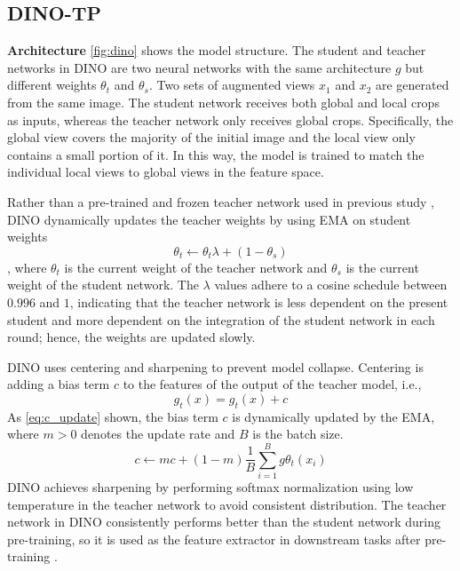 \documentclass[10pt,twocolumn,letterpaper]{article}
\begin{document}
\subsection{DINO-TP}
\label{section:dino-tp}
\textbf{Architecture }
\cref{fig:dino} shows the model structure.
The student and teacher networks in DINO are two neural networks with the same architecture $g$ but different weights $\theta_t$ and $\theta_s$.
Two sets of augmented views $x_1$ and $x_2$ are generated from the same image.
The student network receives both global and local crops as inputs, whereas the teacher network only receives global crops.
Specifically, the global view covers the majority of the initial image and the local view only contains a small portion of it.
In this way, the model is trained to match the individual local views to global views in the feature space.

Rather than a pre-trained and frozen teacher network used in previous study \cite{fang2021seed,chen2020big}, DINO dynamically updates the teacher weights by using EMA on student weights  
\begin{equation}
  \theta_t\gets\theta_t\lambda+(1-\theta_s)
  \label{eq:teacher_w}
\end{equation}
, where $\theta_t$ is the current weight of the teacher network and $\theta_s$ is the current weight of the student network.
The $\lambda$ values adhere to a cosine schedule between $0.996$ and $1$, indicating that the teacher network is less dependent on the present student and more dependent on the integration of the student network in each round; hence, the weights are updated slowly.

DINO uses centering and sharpening to prevent model collapse.
Centering is adding a bias term $c$ to the features of the output of the teacher model, i.e., 
\begin{equation}
  g_t(x) = g_t(x) + c
  \label{eq:centering}
\end{equation}
As \cref{eq:c_update} shown, the bias term $c$ is dynamically updated by the EMA, where $m > 0$ denotes the update rate and $B$ is the batch size.
\begin{equation}
  c\gets mc+(1- m)\frac{1}{B}\sum_{i=1}^B g\theta_t(x_i)
  \label{eq:c_update}
\end{equation}
DINO achieves sharpening by performing softmax normalization using low temperature in the teacher network to avoid consistent distribution.
The teacher network in DINO consistently performs better than the student network during pre-training, so it is used as the feature extractor in downstream tasks after pre-training \cite{caron2021emerging}.
\end{document}
